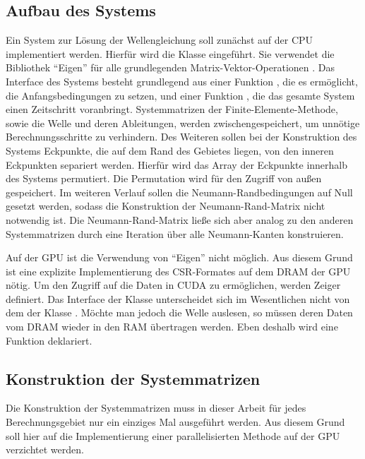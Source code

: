 \documentclass[crop=false,10pt,ngerman]{standalone}
\begin{document}
    \subsection{Aufbau des Systems} %
    \label{sub:aufbau_des_systems}
      Ein System zur Lösung der Wellengleichung soll zunächst auf der CPU implementiert werden.
      Hierfür wird die Klasse  eingeführt.
      Sie verwendet die Bibliothek \enquote{Eigen} für alle grundlegenden Matrix-Vektor-Operationen \cite{Eigen2018}.
      Das Interface des Systems besteht grundlegend aus einer Funktion , die es ermöglicht, die Anfangsbedingungen zu setzen, und einer Funktion , die das gesamte System einen Zeitschritt voranbringt.
      Systemmatrizen der Finite-Elemente-Methode, sowie die Welle und deren Ableitungen, werden zwischengespeichert, um unnötige Berechnungsschritte zu verhindern.
      Des Weiteren sollen bei der Konstruktion des Systems Eckpunkte, die auf dem Rand des Gebietes liegen, von den inneren Eckpunkten separiert werden.
      Hierfür wird das Array der Eckpunkte innerhalb des Systems permutiert.
      Die Permutation wird für den Zugriff von außen gespeichert.
      Im weiteren Verlauf sollen die Neumann-Randbedingungen auf Null gesetzt werden, sodass die Konstruktion der Neumann-Rand-Matrix nicht notwendig ist.
      Die Neumann-Rand-Matrix ließe sich aber analog zu den anderen Systemmatrizen durch eine Iteration über alle Neumann-Kanten konstruieren.

      Auf der GPU ist die Verwendung von \enquote{Eigen} nicht möglich.
      Aus diesem Grund ist eine explizite Implementierung des CSR-Formates auf dem DRAM der GPU nötig.
      Um den Zugriff auf die Daten in CUDA zu ermöglichen, werden Zeiger definiert.
      Das Interface der Klasse  unterscheidet sich im Wesentlichen nicht von dem der Klasse .
      Möchte man jedoch die Welle auslesen, so müssen deren Daten vom DRAM wieder in den RAM übertragen werden.
      Eben deshalb wird eine Funktion  deklariert.


    \subsection{Konstruktion der Systemmatrizen} %
    \label{sub:konstruktion_der_mass_und_stiffness_matrix}
      Die Konstruktion der Systemmatrizen muss in dieser Arbeit für jedes Berechnungsgebiet nur ein einziges Mal ausgeführt werden.
      Aus diesem Grund soll hier auf die Implementierung einer parallelisierten Methode auf der GPU verzichtet werden.
\end{document}
